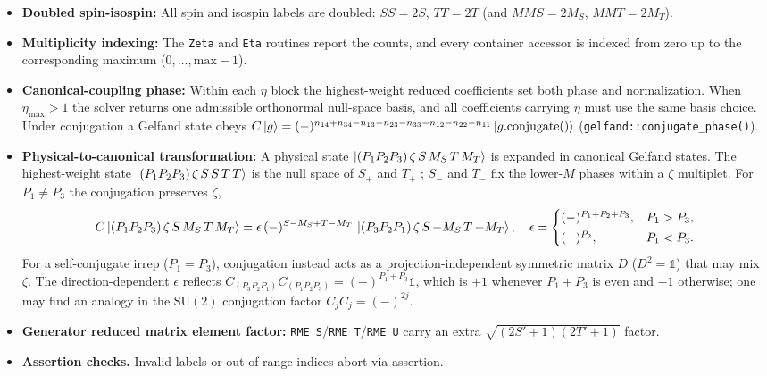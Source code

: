 \documentclass[aps,onecolumn,10pt,superscriptaddress,floatfix,nofootinbib]{revtex4}
\begin{document}
\begin{itemize}
    \item \textbf{Doubled spin-isospin:} All spin and isospin labels are doubled: $SS=2S$, $TT=2T$ (and $MMS=2M_S$, $MMT=2M_T$). %
    \item \textbf{Multiplicity indexing:} The \verb|Zeta| and \verb|Eta| routines report the counts, and every container accessor is indexed from zero up to the corresponding maximum ($0,\dots,\text{max}{-}1$).
    \item \textbf{Canonical-coupling phase:} Within each $\eta$ block the highest-weight reduced coefficients set both phase and normalization. %
    When $\eta_{\max}>1$ the solver returns one admissible orthonormal null-space basis, and all coefficients carrying $\eta$ must use the same basis choice. Under conjugation a Gelfand state obeys $C\ket{g} = (-)^{n_{14}+n_{34}-n_{13}-n_{23}-n_{33}-n_{12}-n_{22}-n_{11}}\ket{g.\mathrm{conjugate}()}$ (\verb|gelfand::conjugate_phase()|).
    \item \textbf{Physical-to-canonical transformation:} A physical state $\ket{(P_1 P_2 P_3)\,\zeta\,S\,M_S\,T\,M_T}$ is expanded in canonical Gelfand states. The highest-weight state $\ket{(P_1 P_2 P_3)\,\zeta\,S\,S\,T\,T}$ is the null space of $S_+$ and $T_+$ \cite{Dang2024EPJP2}; $S_-$ and $T_-$ fix the lower-$M$ phases within a $\zeta$ multiplet. For $P_1\neq P_3$ the conjugation preserves $\zeta$,
    \begin{equation*}
      C\ket{(P_1 P_2 P_3)\,\zeta\,S\,M_S\,T\,M_T}=\epsilon\,(-)^{S-M_S+T-M_T}\,\ket{(P_3 P_2 P_1)\,\zeta\,S\,{-}M_S\,T\,{-}M_T},
      \quad
      \epsilon=\begin{cases}(-)^{P_1+P_2+P_3}, & P_1>P_3,\\[2pt] (-)^{P_2}, & P_1<P_3.\end{cases}
    \end{equation*}
For a self-conjugate irrep ($P_1=P_3$), conjugation instead acts as a projection-independent symmetric matrix $D$ ($D^2=\mathbb{1}$) that may mix $\zeta$. The direction-dependent $\epsilon$ reflects $C_{(P_3 P_2 P_1)}C_{(P_1 P_2 P_3)}=(-)^{P_1+P_3}\mathbb{1}$, which is $+1$ whenever $P_1+P_3$ is even and $-1$ otherwise; one may find an analogy in the $\mathrm{SU(2)}$ conjugation factor $C_j C_j = (-)^{2j}$.
    \item \textbf{Generator reduced matrix element factor:} \verb|RME_S|/\verb|RME_T|/\verb|RME_U| carry an extra $\sqrt{(2S'{+}1)(2T'{+}1)}$ factor.
    \item \textbf{Assertion checks.} Invalid labels or out-of-range indices abort via assertion.
\end{itemize}
\end{document}
